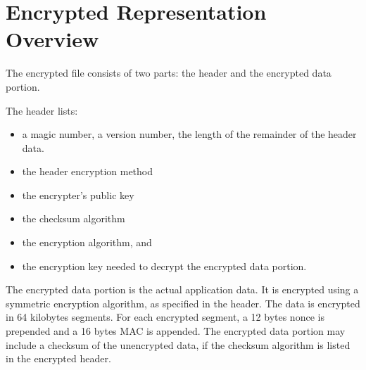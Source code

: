 \section{Encrypted Representation Overview}
The encrypted file consists of two parts: the header and the encrypted data portion.

The header lists:
\begin{itemize}
\item a magic number, a version number, the length of the remainder of the header data.
\item the header encryption method
\item the encrypter's public key
\item the checksum algorithm
\item the encryption algorithm, and
\item the encryption key needed to decrypt the encrypted data portion.
\end{itemize}

The encrypted data portion is the actual application data.
% 
It is encrypted using a symmetric encryption algorithm, as specified in the header.
% 
The data is encrypted in 64 kilobytes segments. For each encrypted segment, a 12 bytes nonce is prepended and a 16 bytes MAC is appended.
% 
The encrypted data portion may include a checksum of the unencrypted data, if the checksum algorithm is listed in the encrypted header.

